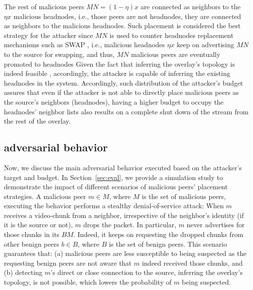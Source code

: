 The rest of malicious peers $MN=(1-\eta) x$ are connected as neighbors to the $\eta x$ malicious headnodes, i.e., those peers are not headnodes, they are connected as neighbors to the malicious headnodes. 
Such placement is considered the best strategy for the attacker since $MN$ is used to counter headnodes replacement mechanisms such as SWAP \cite{nguyen2016swap}, i.e., malicious headnodes $\eta x$ keep on advertising $MN$ to the source for swapping, and thus, $MN$ malicious peers are eventually promoted to headnodes
Given the fact that inferring the overlay's topology is indeed feasible \cite{nguyen2016swap,rbcs}, accordingly, the attacker is capable of inferring the existing headnodes in the system.
Accordingly, such distribution of the attacker's budget assures that even if the attacker is not able to directly place malicious peers as the source's neighbors (headnodes), having a higher budget to occupy the headnodes' neighbor lists also results on a complete shut down of the stream from the rest of the overlay.



\subsection{\drop adversarial behavior}
Now, we discuss the main adversarial behavior executed based on the attacker's target and budget. 
In Section~\ref{sec:eval}, we provide a simulation study to demonstrate the impact of different scenarios of malicious peers' placement strategies. 
A malicious peer $m \in M$, where $M$ is the set of malicious peers, executing the \drop behavior performs a stealthy denial-of-service attack: 
When $m$ receives a video-chunk from a neighbor, irrespective of the neighbor's identity (if it is the source or not), $m$ drops the packet.
In particular, $m$ never advertises for those chunks in its $BM$.
Indeed, it keeps on requesting the dropped chunks from other benign peers $b \in B$, where $B$ is the set of benign peers.
This scenario guarantees that: (a) malicious peers are less susceptible to being suspected as the requesting benign peers are not aware that $m$ indeed received those chunks,
and (b) detecting $m$'s direct or close connection to the source, inferring the overlay's topology, is not possible, which lowers the probability of $m$ being suspected.

